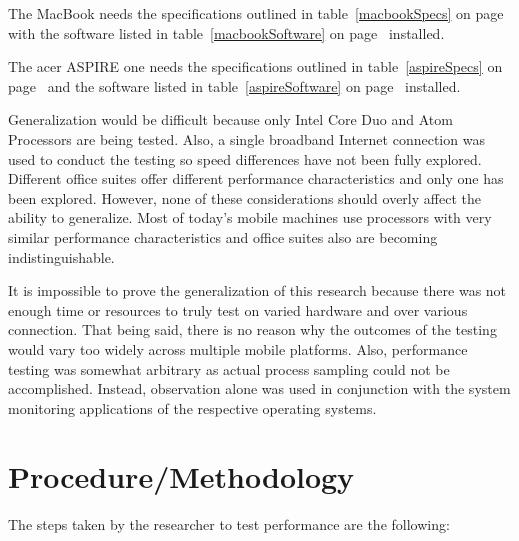The MacBook needs the specifications outlined in table~\ref{macbookSpecs} on
page~\pageref{macbookSpecs} with the software listed in
table~\ref{macbookSoftware} on page~\pageref{macbookSoftware} installed.

The acer ASPIRE one needs the specifications outlined in table~\ref{aspireSpecs}
on page~\pageref{aspireSpecs} and the software listed in
table~\ref{aspireSoftware} on page~\pageref{aspireSoftware} installed.









Generalization would be difficult because only Intel Core Duo and Atom
Processors are being tested.  Also, a single broadband Internet connection was
used to conduct the testing so speed differences have not been fully explored.
Different office suites offer different performance characteristics and only one
has been explored.  However, none of these considerations should overly affect
the ability to generalize.  Most of today's mobile machines use processors with
very similar performance characteristics and office suites also are becoming
indistinguishable.

It is impossible to prove the generalization of this research because there was
not enough time or resources to truly test on varied hardware and over various
connection.  That being said, there is no reason why the outcomes of the testing
would vary too widely across multiple mobile platforms.  Also, performance
testing was somewhat arbitrary as actual process sampling could not be
accomplished.  Instead, observation alone was used in conjunction with the
system monitoring applications of the respective operating systems.

\section{Procedure/Methodology}


The steps taken by the researcher to test performance are the following:

